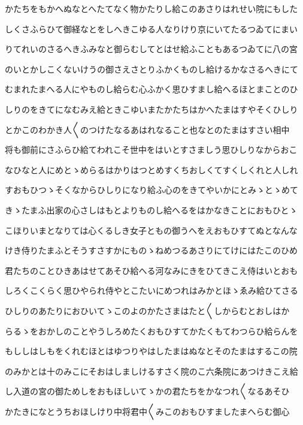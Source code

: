 \documentclass[a4paper,11pt,landscape]{ltjtarticle}
\begin{document}
\par\medskip
かたちをもかへぬなとへたてなく物かたりし給このあさりはれせい院にもした
\par\medskip
しくさふらひて御経なとをしへきこゆる人なりけり京にいてたるつゐてにまい
\par\medskip
りてれいのさるへきふみなと御らむしてとはせ給ふこともあるつゐてに八の宮
\par\medskip
のいとかしこくないけうの御さえさとりふかくものし給けるかなさるへきにて
\par\medskip
むまれたまへる人にやものし給らむ心ふかく思ひすまし給へるほとまことのひ
\par\medskip
しりのをきてになむみえ給ときこゆいまたかたちはかへたまはすやそくひしり
\par\medskip
とかこのわかき人〱のつけたなるあはれなること也なとのたまはすさい相中
\par\medskip
将も御前にさふらひ給てわれこそ世中をはいとすさましう思ひしりなからおこ
\par\medskip
なひなと人にめとゝめらるはかりはつとめすくちおしくてすくしくれと人しれ
\par\medskip
すおもひつゝそくなからひしりになり給ふ心のをきてやいかにとみゝとゝめて
\par\medskip
きゝたまふ出家の心さしはもとよりものし給へるをはかなきことにおもひとゝ
\par\medskip
こほりいまとなりては心くるしき女子ともの御うへをえおもひすてぬとなんな
\par\medskip
けき侍りたまふとそうすさすかにものゝねめつるあさりにてけにはたこのひめ
\par\medskip
君たちのことひきあはせてあそひ給へる河なみにきをひてきこえ侍はいとおも
\par\medskip
しろくこくらく思ひやられ侍やとこたいにめつれはみかとほゝゑみ給ひてさる
\par\medskip
ひしりのあたりにおひいてゝこのよのかたさまはたと〱しからむとおしはか
\par\medskip
らるゝをおかしのことやうしろめたくおもひすてかたくもてわつらひ給らんを
\par\medskip
もししはしもをくれむほとはゆつりやはしたまはぬなとそのたまはするこの院
\par\medskip
のみかとは十のみこにそおはしましけるすさく院のこ六条院にあつけきこえ給
\par\medskip
し入道の宮の御ためしをおもほしいてゝかの君たちをかなつれ〱なるあそひ
\par\medskip
かたきになとうちおほしけり中将君中〱みこのおもひすましたまへらむ御心
\par\medskip
\end{document}
